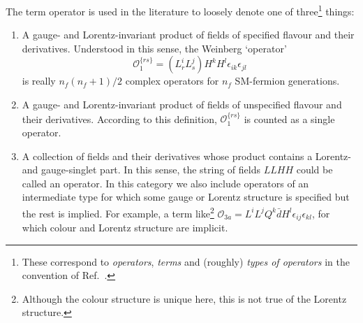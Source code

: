 The term operator is used in the literature to loosely denote one of
three\footnote{These correspond to \textit{operators}, \textit{terms} and
  (roughly) \textit{types of operators} in the convention of
  Ref.~\cite{Fonseca:2019yya}.} things:
\begin{enumerate}
  \item A gauge- and Lorentz-invariant product of fields of specified flavour
  and their derivatives. Understood in this sense, the Weinberg `operator'
  \begin{equation}
    \mathcal{O}_{1}^{\{rs\}} = (L_{r}^{i}L_{s}^{j})H^{k}H^{l}\epsilon_{ik}\epsilon_{jl}
  \end{equation}
  is really $n_{f}(n_{f}+1)/2$ complex operators for $n_{f}$ SM-fermion
  generations.
  \item A gauge- and Lorentz-invariant product of fields of unspecified flavour
  and their derivatives. According to this definition,
  $\mathcal{O}_{1}^{\{rs\}}$ is counted as a single operator.
  \item A collection of fields and their derivatives whose product contains a
  Lorentz- and gauge-singlet part. In this sense, the string of fields $LLHH$
  could be called an operator. In this category we also include operators of
  an intermediate type for which some gauge or Lorentz structure is specified
  but the rest is implied. For example, a term like\footnote{Although the
    colour structure is unique here, this is not true of the Lorentz structure.}
  $\mathcal{O}_{3a} = L^{i}L^{j}Q^{k}\bar{d}H^{l} \epsilon_{ij}\epsilon_{kl}$,
  for which colour and Lorentz structure are implicit.
\end{enumerate}

